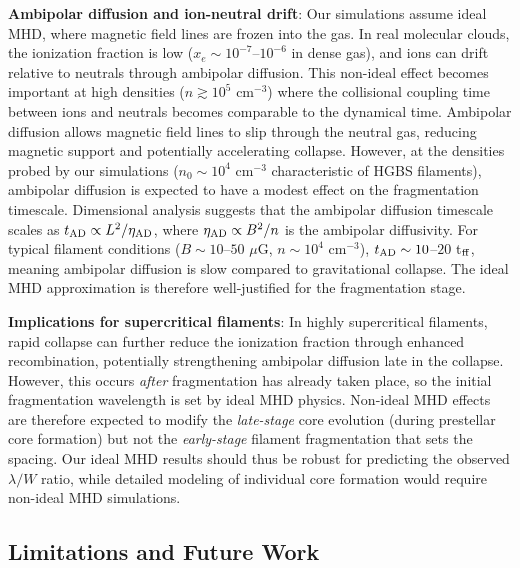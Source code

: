 \documentclass[twoside,twocolumn]{mnras}
\begin{document}
\textbf{Ambipolar diffusion and ion-neutral drift}: Our simulations assume ideal MHD, where magnetic field lines are frozen into the gas. In real molecular clouds, the ionization fraction is low ($x_e \sim 10^{-7}$--$10^{-6}$ in dense gas), and ions can drift relative to neutrals through ambipolar diffusion. This non-ideal effect becomes important at high densities ($n \gtrsim 10^5$ cm$^{-3}$) where the collisional coupling time between ions and neutrals becomes comparable to the dynamical time. Ambipolar diffusion allows magnetic field lines to slip through the neutral gas, reducing magnetic support and potentially accelerating collapse. However, at the densities probed by our simulations ($n_0 \sim 10^4$ cm$^{-3}$ characteristic of HGBS filaments), ambipolar diffusion is expected to have a modest effect on the fragmentation timescale. Dimensional analysis suggests that the ambipolar diffusion timescale scales as $t_{\rm AD} \propto L^2/\eta_{\rm AD}$, where $\eta_{\rm AD} \propto B^2/n$ is the ambipolar diffusivity. For typical filament conditions ($B \sim 10$--$50$ $\mu$G, $n \sim 10^4$ cm$^{-3}$), $t_{\rm AD} \sim 10$--$20$ t$_{\rm ff}$, meaning ambipolar diffusion is slow compared to gravitational collapse. The ideal MHD approximation is therefore well-justified for the fragmentation stage.

\textbf{Implications for supercritical filaments}: In highly supercritical filaments, rapid collapse can further reduce the ionization fraction through enhanced recombination, potentially strengthening ambipolar diffusion late in the collapse. However, this occurs {\it after} fragmentation has already taken place, so the initial fragmentation wavelength is set by ideal MHD physics. Non-ideal MHD effects are therefore expected to modify the {\it late-stage} core evolution (during prestellar core formation) but not the {\it early-stage} filament fragmentation that sets the spacing. Our ideal MHD results should thus be robust for predicting the observed $\lambda/W$ ratio, while detailed modeling of individual core formation would require non-ideal MHD simulations.

\subsection{Limitations and Future Work}
\end{document}
